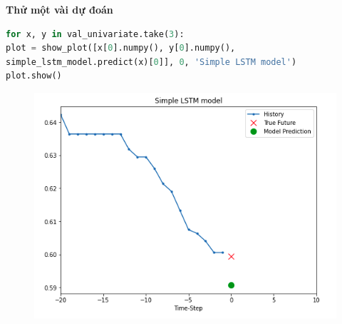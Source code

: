 \vspace{0.25cm}
\changefontsizes{13pt}
\setlength{\parindent}{0cm}
\textbf{Thử một vài dự đoán}


\begin{lstlisting}[language=Python]
for x, y in val_univariate.take(3):
plot = show_plot([x[0].numpy(), y[0].numpy(),
simple_lstm_model.predict(x)[0]], 0, 'Simple LSTM model')
plot.show()
\end{lstlisting}





\vspace{-1cm}
\begin{center}
	\begin{figure}[htp]
		\begin{center}
			\includegraphics[scale=0.5]{./images/3.png}
		\end{center}
	\end{figure}
\end{center}




